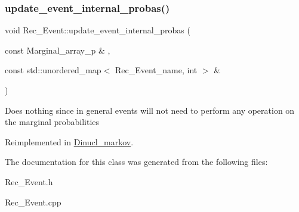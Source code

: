 \subsubsection{\texorpdfstring{update\+\_\+event\+\_\+internal\+\_\+probas()}{update\_event\_internal\_probas()}}
{\footnotesize\ttfamily void Rec\+\_\+\+Event\+::update\+\_\+event\+\_\+internal\+\_\+probas (\begin{DoxyParamCaption}\item[{const Marginal\+\_\+array\+\_\+p \&}]{,  }\item[{const std\+::unordered\+\_\+map$<$ Rec\+\_\+\+Event\+\_\+name, int $>$ \&}]{ }\end{DoxyParamCaption})\hspace{0.3cm}{\ttfamily [virtual]}}

Does nothing since in general events will not need to perform any operation on the marginal probabilities 

Reimplemented in \hyperlink{classDinucl__markov_a8da33acb0a389a0a4c845a69c11b173c}{Dinucl\+\_\+markov}.



The documentation for this class was generated from the following files\+:\begin{DoxyCompactItemize}
\item 
Rec\+\_\+\+Event.\+h\item 
Rec\+\_\+\+Event.\+cpp\end{DoxyCompactItemize}

